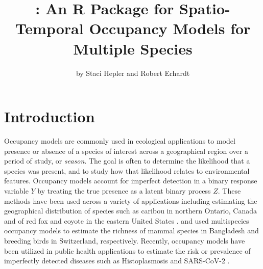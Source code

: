 
\newcommand{\bfW}{{\bf W}}
\newcommand{\bfX}{{\bf X}}
\newcommand{\bfbeta}{\mbox{\boldmath $\beta$}}
\newcommand{\bfeta}{\mbox{\boldmath $\eta$}}
\newcommand{\bfalpha}{\mbox{\boldmath $\alpha$}}
\newcommand{\bfgamma}{\mbox{\boldmath $\gamma$}}

\title{: An R Package for Spatio-Temporal Occupancy Models for Multiple Species}
\author{by Staci Hepler and Robert Erhardt}

\maketitle


\section{Introduction}

Occupancy models are commonly used in ecological applications to model presence or absence of a species of interest across a geographical region over a period of study, or \textit{season}. The goal is often to determine the likelihood that a species was present, and to study how that likelihood relates to environmental features. Occupancy models account for imperfect detection in a binary response variable $Y$ by treating the true presence as a latent binary process $Z$. These methods have been used across a variety of applications including estimating the geographical distribution of species such as caribou in northern Ontario, Canada \citep{johnson2013} and of red fox and coyote in the eastern United States \citep{rota2016}. \citet{rahman2021} and \citet{guillera2019} used multispecies occupancy models to estimate the richness of mammal species in Bangladesh and breeding birds in Switzerland, respectively. Recently, occupancy models have been utilized in public health applications to estimate the risk or prevalence of imperfectly detected diseases such as Histoplasmosis \citep{hepler2022histo} and SARS-CoV-2 \citep{sanderlin2021}. 

